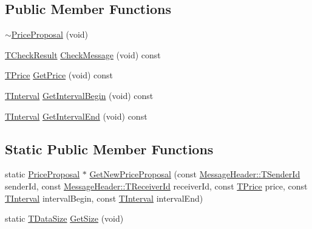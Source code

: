 \subsection*{Public Member Functions}
\begin{DoxyCompactItemize}
\item 
\hyperlink{class_terra_swarm_1_1_synchronous_1_1_price_proposal_aadf58e38bb170e8e84b611b444022393}{$\sim$\-Price\-Proposal} (void)
\item 
\hyperlink{class_terra_swarm_1_1_synchronous_1_1_price_proposal_ab5aef6a74a44439eb880f7dbff610b57}{T\-Check\-Result} \hyperlink{class_terra_swarm_1_1_synchronous_1_1_price_proposal_af3e0454c5d8e4b83fc0fc2c1b0838e96}{Check\-Message} (void) const 
\item 
\hyperlink{class_terra_swarm_1_1_synchronous_1_1_price_proposal_a663093d390a30942a07eee3681ff8fe2}{T\-Price} \hyperlink{class_terra_swarm_1_1_synchronous_1_1_price_proposal_ad8e9ec2676e1cce4e77cf3fff3bf5797}{Get\-Price} (void) const 
\item 
\hyperlink{class_terra_swarm_1_1_synchronous_1_1_price_proposal_a37e6344d030c7695bb9cb341648928ee}{T\-Interval} \hyperlink{class_terra_swarm_1_1_synchronous_1_1_price_proposal_a935112fee62baf6ca05eeb523bd4faf9}{Get\-Interval\-Begin} (void) const 
\item 
\hyperlink{class_terra_swarm_1_1_synchronous_1_1_price_proposal_a37e6344d030c7695bb9cb341648928ee}{T\-Interval} \hyperlink{class_terra_swarm_1_1_synchronous_1_1_price_proposal_a922bd8c1cbc702f1224b1e6dce6beb3d}{Get\-Interval\-End} (void) const 
\end{DoxyCompactItemize}
\subsection*{Static Public Member Functions}
\begin{DoxyCompactItemize}
\item 
static \hyperlink{class_terra_swarm_1_1_synchronous_1_1_price_proposal}{Price\-Proposal} $\ast$ \hyperlink{class_terra_swarm_1_1_synchronous_1_1_price_proposal_a6936d20aa34398a5f32a78b98e9af1d1}{Get\-New\-Price\-Proposal} (const \hyperlink{class_terra_swarm_1_1_message_header_a516b36855e2aad7cfbf8770f1b42784f}{Message\-Header\-::\-T\-Sender\-Id} sender\-Id, const \hyperlink{class_terra_swarm_1_1_message_header_aa3260702b182b6f88ddbdd3416e98df0}{Message\-Header\-::\-T\-Receiver\-Id} receiver\-Id, const \hyperlink{class_terra_swarm_1_1_synchronous_1_1_price_proposal_a663093d390a30942a07eee3681ff8fe2}{T\-Price} price, const \hyperlink{class_terra_swarm_1_1_synchronous_1_1_price_proposal_a37e6344d030c7695bb9cb341648928ee}{T\-Interval} interval\-Begin, const \hyperlink{class_terra_swarm_1_1_synchronous_1_1_price_proposal_a37e6344d030c7695bb9cb341648928ee}{T\-Interval} interval\-End)
\item 
static \hyperlink{namespace_terra_swarm_a092e6ec9739175076ae3106783f5c1b6}{T\-Data\-Size} \hyperlink{class_terra_swarm_1_1_synchronous_1_1_price_proposal_abbb9ecb920cda08184eed9225600f47e}{Get\-Size} (void)
\end{DoxyCompactItemize}
